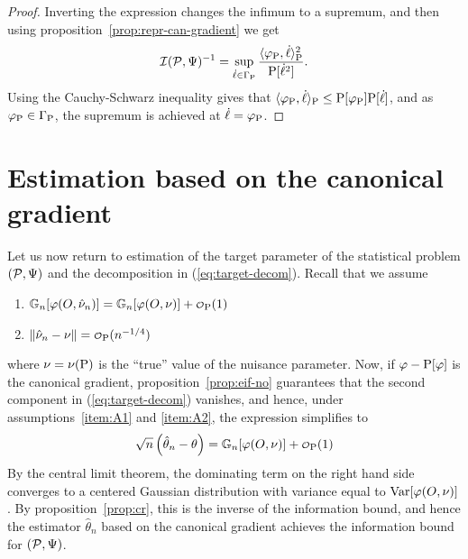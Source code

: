 \documentclass[a4,danish]{article}
\begin{document}
\begin{proof}
  Inverting the expression changes the infimum to a supremum, and then using
  proposition~\ref{prop:repr-can-gradient} we get
  \begin{equation*}
    \mathcal{I}(\mathcal{P}, \TT)^{-1} = 
    \sup_{\dot{\ell} \in \Gamma_{\P}}
    \frac{\langle\phi_{\P}, \dot{\ell} \rangle_{\P}^2}{\P[\dot{\ell}^2]}.
  \end{equation*}
  Using the Cauchy-Schwarz inequality gives that
  $\langle\phi_{\P}, \dot{\ell} \rangle_{\P} \leq \P[\phi_{\P}] \P[\dot{\ell}]$, and as
  $\phi_{\P} \in \Gamma_{\P}$, the supremum is achieved at $\dot{\ell}=\phi_{\P}$.
\end{proof}


 

\section{Estimation based on the canonical gradient}
\label{sec:estim-based-canon}

Let us now return to estimation of the target parameter of the statistical problem
$(\mathcal{P}, \TT)$ and the decomposition in (\ref{eq:target-decom}). Recall that we assume
\begin{enumerate}[label=A\arabic*:, ref=A\arabic*, topsep=0pt]
\item \label{item:A1} $\G{\phi(O,\hat{\nu}_n)} = \G{\phi(O,\nu)} + \smallO_{\P}(1)$
\item \label{item:A2} $\Vert \hat{\nu}_n - \nu\Vert = \smallO_{\P}(n^{-1/4})$
\end{enumerate}
where $\nu = \nu(\P)$ is the ``true'' value of the nuisance parameter. Now, if $\phi - \P[\phi]$ is
the canonical gradient, proposition~\ref{prop:eif-no} guarantees that the second component in
(\ref{eq:target-decom}) vanishes, and hence, under assumptions~\ref{item:A1} and \ref{item:A2}, the
expression simplifies to
\begin{equation*}
    \sqrt{n}
  \left(
    \hat{\theta}_n - \theta
  \right)
  = \G{\phi( O, \nu)} + \smallO_{\P}(1)
\end{equation*}
By the central limit theorem, the dominating term on the right hand side converges to a centered
Gaussian distribution with variance equal to $\V[\phi(O, \nu)]$. By proposition~\ref{prop:cr},
this is the inverse of the information bound, and hence the estimator $\hat{\theta}_n$ based on the
canonical gradient achieves the information bound for $(\mathcal{P}, \TT)$.
\end{document}
